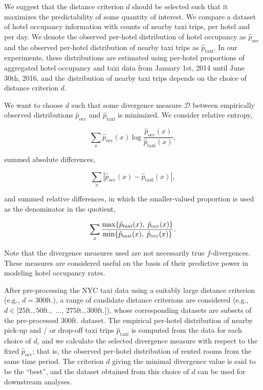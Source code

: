 \documentclass[useAMS, usenatbib]{biom}
\begin{document}
We suggest that the distance criterion $d$ should be selected such that it maximizes the predictability of some quantity of interest. We compare a dataset of hotel occupancy information with counts of nearby taxi trips, per hotel and per day. We denote the observed per-hotel distribution of hotel occupancy as $\hat{p}_{\mathrm{occ}}$ and the observed per-hotel distribution of nearby taxi trips as $\hat{p}_{\mathrm{taxi}}$. In our experiments, these distributions are estimated using per-hotel proportions of aggregated hotel occupancy and taxi data from January 1st, 2014 until June 30th, 2016, and the distribution of nearby taxi trips depends on the choice of distance criterion $d$.

We want to choose $d$ such that some divergence measure $\mathcal{D}$ between empirically observed distributions $\hat{p}_{\mathrm{occ}}$ and $\hat{p}_{\mathrm{taxi}}$ is minimized. We consider relative entropy,

$$\sum_x \hat{p}_{\mathrm{occ}} (x) \log \frac{\hat{p}_{\mathrm{occ}} (x)}{\hat{p}_{\mathrm{taxi}} (x)},$$

summed absolute differences,

$$\sum_x | \hat{p}_{\mathrm{occ}} (x) - \hat{p}_{\mathrm{taxi}} (x) |,$$

and summed relative differences, in which the smaller-valued proportion is used as the denominator in the quotient,

$$\sum_x \frac{\max \{ \hat{p}_{\mathrm{taxi}} (x), \hspace*{0.1cm} \hat{p}_{\mathrm{occ}} (x) \}}{\min \{ \hat{p}_{\mathrm{taxi}} (x), \hspace*{0.1cm} \hat{p}_{\mathrm{occ}} (x) \}}.$$

Note that the divergence measures used are not necessarily true $f$-divergences. These measures are considered useful on the basis of their predictive power in modeling hotel occupancy rates.

After pre-processing the NYC taxi data using a suitably large distance criterion (e.g., $d = 300$ft.), a range of candidate distance criterions are considered (e.g., $d \in [25 \mathrm{ft.}, 50 \mathrm{ft.},$ ..., $275 \mathrm{ft.}, 300 \mathrm{ft.}]$), whose corresponding datasets are subsets of the pre-processed 300ft. dataset. The empirical per-hotel distribution of nearby pick-up and / or drop-off taxi trips $\hat{p}_{\mathrm{taxi}}$ is computed from the data for each choice of $d$, and we calculate the selected divergence measure with respect to the fixed $\hat{p}_{\mathrm{occ}}$; that is, the observed per-hotel distribution of rented rooms from the same time period. The criterion $d$ giving the minimal divergence value is said to be the ``best'', and the dataset obtained from this choice of $d$ can be used for downstream analyses.
\end{document}
